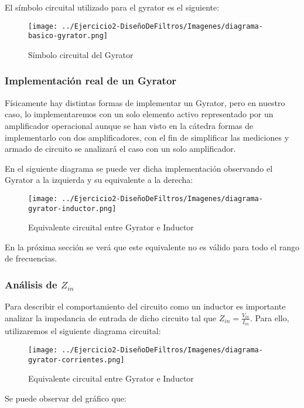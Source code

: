 El símbolo circuital utilizado para el gyrator es el siguiente:

\begin{figure}[H]
    \centering
    \texttt{[image: ../Ejercicio2-DiseñoDeFiltros/Imagenes/diagrama-basico-gyrator.png]}
    \caption{Símbolo circuital del Gyrator}
\end{figure}

\subsubsection{Implementación real de un Gyrator}

Físicamente hay distintas formas de implementar un Gyrator, pero en nuestro caso, lo implementaremos con un solo elemento activo representado
por un amplificador operacional aunque se han visto en la cátedra formas de implementarlo con dos amplificadores, con el fin de simplificar las mediciones
y armado de circuito se analizará el caso con un solo amplificador.

En el siguiente diagrama se puede ver dicha implementación observando el Gyrator a la izquierda y su equivalente a la derecha:

\begin{figure}[H]
    \centering
    \texttt{[image: ../Ejercicio2-DiseñoDeFiltros/Imagenes/diagrama-gyrator-inductor.png]}
    \caption{Equivalente circuital entre Gyrator e Inductor}
\end{figure}

En la próxima sección se verá que este equivalente no es válido para todo el rango de frecuencias.

\subsubsection{Análisis de $Z_{in}$}

Para describir el comportamiento del circuito como un inductor es importante 
analizar la impedancia de entrada de dicho circuito tal que $Z_{in}=\frac{V_{in}}{I_{in}}$. 
Para ello, utilizaremos el siguiente diagrama circuital:

\begin{figure}[H]
    \centering
    \texttt{[image: ../Ejercicio2-DiseñoDeFiltros/Imagenes/diagrama-gyrator-corrientes.png]}
    \caption{Equivalente circuital entre Gyrator e Inductor}
\end{figure}

Se puede observar del gráfico que:

